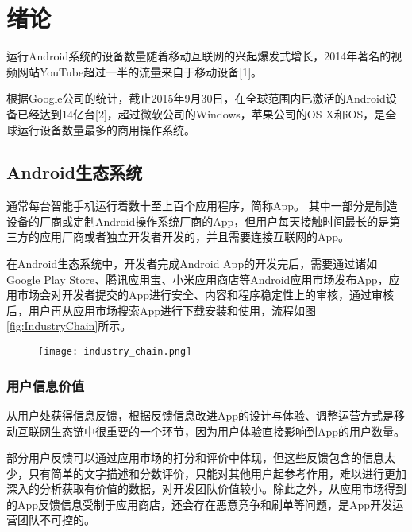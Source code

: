 
\chapter{绪论}
\label{chap:intro}

运行Android系统的设备数量随着移动互联网的兴起爆发式增长，2014年著名的视频网站YouTube超过一半的流量来自于移动设备[1]。

根据Google公司的统计，截止2015年9月30日，在全球范围内已激活的Android设备已经达到14亿台[2]，超过微软公司的Windows，苹果公司的OS X和iOS，是全球运行设备数量最多的商用操作系统。

\section{Android生态系统}
\label{sec:android_ecosystem}

通常每台智能手机运行着数十至上百个应用程序，简称App。
其中一部分是制造设备的厂商或定制Android操作系统厂商的App，但用户每天接触时间最长的是第三方的应用厂商或者独立开发者开发的，并且需要连接互联网的App。

在Android生态系统中，开发者完成Android App的开发完后，需要通过诸如Google Play Store、腾讯应用宝、小米应用商店等Android应用市场发布App，应用市场会对开发者提交的App进行安全、内容和程序稳定性上的审核，通过审核后，用户再从应用市场搜索App进行下载安装和使用，流程如图\ref{fig:IndustryChain}所示。

\begin{figure}[!htp]
	\centering
	\texttt{[image: industry\_chain.png]}
\end{figure}

\subsection{用户信息价值}

从用户处获得信息反馈，根据反馈信息改进App的设计与体验、调整运营方式是移动互联网生态链中很重要的一个环节，因为用户体验直接影响到App的用户数量。

部分用户反馈可以通过应用市场的打分和评价中体现，但这些反馈包含的信息太少，只有简单的文字描述和分数评价，只能对其他用户起参考作用，难以进行更加深入的分析获取有价值的数据，对开发团队价值较小。除此之外，从应用市场得到的App反馈信息受制于应用商店，还会存在恶意竞争和刷单等问题，是App开发运营团队不可控的。

